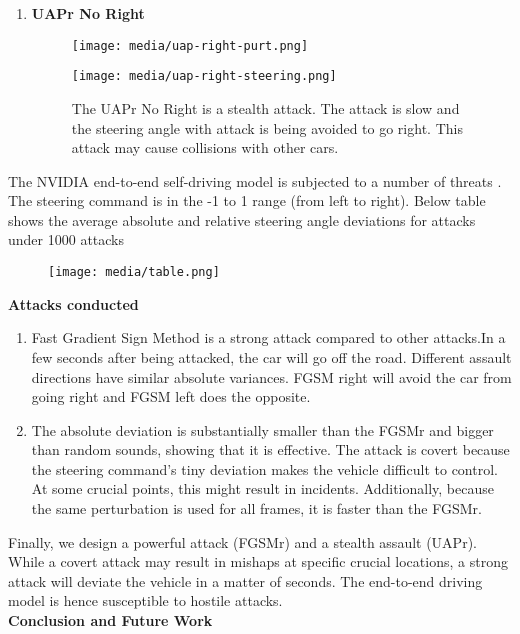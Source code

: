 \documentclass[ 12pt,a4paper,twocolumn,fleqn]{article}
\begin{document}
\begin{enumerate}
    \item \textbf{UAPr No Right}
    \begin{figure}[H]
    \texttt{[image: media/uap-right-purt.png]}
    \centering
    \end{figure}
    \begin{figure}[H]
    \texttt{[image: media/uap-right-steering.png]}
    \centering
    \caption{The UAPr No Right is a stealth attack. The attack is slow and the steering angle with attack  is being avoided to go right. This attack may cause collisions with other cars.}
    \end{figure}

\end{enumerate}
The NVIDIA end-to-end self-driving model is subjected to a number of threats . The steering command is in the -1 to 1 range (from left to right). Below table shows the average absolute and relative steering angle deviations for attacks under 1000 attacks

\begin{figure}[H]
\texttt{[image: media/table.png]}
\centering
\end{figure}
\textbf{Attacks conducted}
\begin{enumerate}
    \item Fast Gradient Sign Method is a strong attack compared to other attacks.In a few seconds after being attacked, the car will go off the road. Different assault directions have similar absolute variances. FGSM right will avoid the car from going right and FGSM left does the opposite.
    \item The absolute deviation is substantially smaller than the FGSMr and bigger than random sounds, showing that it is effective. The attack is covert because the steering command's tiny deviation makes the vehicle difficult to control. At some crucial points, this might result in incidents. Additionally, because the same perturbation is used for all frames, it is faster than the FGSMr.
\end{enumerate}

Finally, we design a powerful attack (FGSMr) and a stealth assault (UAPr). While a covert attack may result in mishaps at specific crucial locations, a strong attack will deviate the vehicle in a matter of seconds. The end-to-end driving model is hence susceptible to hostile attacks.\\


\textbf{\LARGE{Conclusion and Future Work}}\\
\end{document}
